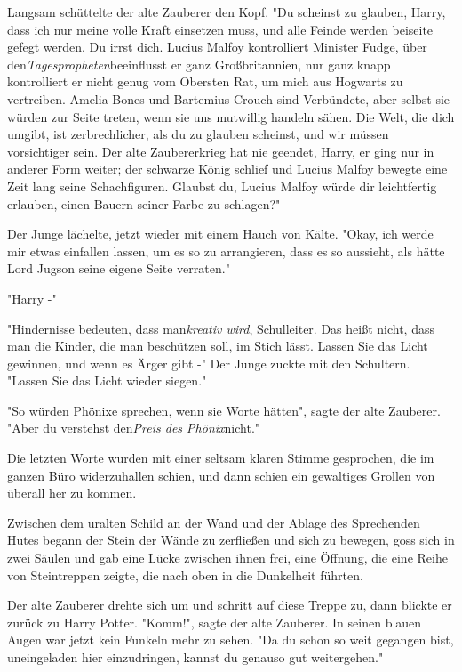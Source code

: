 {Langsam schüttelte der alte Zauberer den Kopf. "Du scheinst zu glauben, Harry, dass ich nur meine volle Kraft einsetzen muss, und alle Feinde werden beiseite gefegt werden. Du irrst dich. Lucius Malfoy kontrolliert Minister Fudge, über den\emph{Tagespropheten}beeinflusst er ganz Großbritannien, nur ganz knapp kontrolliert er nicht genug vom Obersten Rat, um mich aus Hogwarts zu vertreiben. Amelia Bones und Bartemius Crouch sind Verbündete, aber selbst sie würden zur Seite treten, wenn sie uns mutwillig handeln sähen. Die Welt, die dich umgibt, ist zerbrechlicher, als du zu glauben scheinst, und wir müssen vorsichtiger sein. Der alte Zaubererkrieg hat nie geendet, Harry, er ging nur in anderer Form weiter; der schwarze König schlief und Lucius Malfoy bewegte eine Zeit lang seine Schachfiguren. Glaubst du, Lucius Malfoy würde dir leichtfertig erlauben, einen Bauern seiner Farbe zu schlagen?"

Der Junge lächelte, jetzt wieder mit einem Hauch von Kälte. "Okay, ich werde mir etwas einfallen lassen, um es so zu arrangieren, dass es so aussieht, als hätte Lord Jugson seine eigene Seite verraten."

"Harry -"

"Hindernisse bedeuten, dass man\emph{kreativ wird}, Schulleiter. Das heißt nicht, dass man die Kinder, die man beschützen soll, im Stich lässt. Lassen Sie das Licht gewinnen, und wenn es Ärger gibt -" Der Junge zuckte mit den Schultern. "Lassen Sie das Licht wieder siegen."

"So würden Phönixe sprechen, wenn sie Worte hätten", sagte der alte Zauberer. "Aber du verstehst den\emph{Preis des Phönix}nicht."

Die letzten Worte wurden mit einer seltsam klaren Stimme gesprochen, die im ganzen Büro widerzuhallen schien, und dann schien ein gewaltiges Grollen von überall her zu kommen.

Zwischen dem uralten Schild an der Wand und der Ablage des Sprechenden Hutes begann der Stein der Wände zu zerfließen und sich zu bewegen, goss sich in zwei Säulen und gab eine Lücke zwischen ihnen frei, eine Öffnung, die eine Reihe von Steintreppen zeigte, die nach oben in die Dunkelheit führten.

Der alte Zauberer drehte sich um und schritt auf diese Treppe zu, dann blickte er zurück zu Harry Potter. "Komm!", sagte der alte Zauberer. In seinen blauen Augen war jetzt kein Funkeln mehr zu sehen. "Da du schon so weit gegangen bist, uneingeladen hier einzudringen, kannst du genauso gut weitergehen."

}
